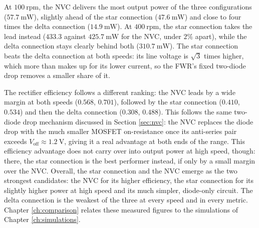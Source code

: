 At $100\ \text{rpm}$, the NVC delivers the most output power of the three configurations ($57.7\ \text{mW}$), slightly ahead of the star connection ($47.6\ \text{mW}$) and close to four times the delta connection ($14.9\ \text{mW}$). At $400\ \text{rpm}$, the star connection takes the lead instead ($433.3$ against $425.7\ \text{mW}$ for the NVC, under $2\%$ apart), while the delta connection stays clearly behind both ($310.7\ \text{mW}$). The star connection beats the delta connection at both speeds: its line voltage is $\sqrt{3}$ times higher, which more than makes up for its lower current, so the FWR's fixed two-diode drop removes a smaller share of it.

The rectifier efficiency follows a different ranking: the NVC leads by a wide margin at both speeds ($0.568$, $0.701$), followed by the star connection ($0.410$, $0.534$) and then the delta connection ($0.308$, $0.488$). This follows the same two-diode drop mechanism discussed in Section \ref{sec:nvc}: the NVC replaces the diode drop with the much smaller MOSFET on-resistance once its anti-series pair exceeds $V_\text{off}\approx1.2\ \text{V}$, giving it a real advantage at both ends of the range. This efficiency advantage does not carry over into output power at high speed, though: there, the star connection is the best performer instead, if only by a small margin over the NVC. Overall, the star connection and the NVC emerge as the two strongest candidates: the NVC for its higher efficiency, the star connection for its slightly higher power at high speed and its much simpler, diode-only circuit. The delta connection is the weakest of the three at every speed and in every metric. Chapter \ref{ch:comparison} relates these measured figures to the simulations of Chapter \ref{ch:simulations}.
